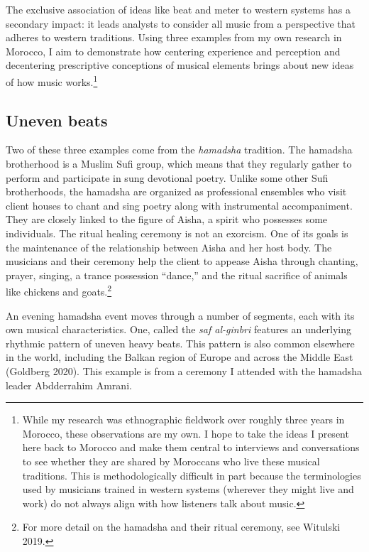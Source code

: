 \documentclass[twoside]{article}
\begin{document}
The exclusive association of ideas like beat and meter to western
systems has a secondary impact: it leads analysts to consider all music
from a perspective that adheres to western traditions. Using three
examples from my own research in Morocco, I aim to demonstrate how
centering experience and perception and decentering prescriptive
conceptions of musical elements brings about new ideas of how music
works.\footnote{While my research was ethnographic fieldwork over
  roughly three years in Morocco, these observations are my own. I hope
  to take the ideas I present here back to Morocco and make them central
  to interviews and conversations to see whether they are shared by
  Moroccans who live these musical traditions. This is methodologically
  difficult in part because the terminologies used by musicians trained
  in western systems (wherever they might live and work) do not always
  align with how listeners talk about music.}

\hypertarget{uneven-beats}{%
\subsection{Uneven beats}\label{uneven-beats}}

Two of these three examples come from the \emph{hamadsha} tradition. The
hamadsha brotherhood is a Muslim Sufi group, which means that they
regularly gather to perform and participate in sung devotional poetry.
Unlike some other Sufi brotherhoods, the hamadsha are organized as
professional ensembles who visit client houses to chant and sing poetry
along with instrumental accompaniment. They are closely linked to the
figure of Aisha, a spirit who possesses some individuals. The ritual
healing ceremony is not an exorcism. One of its goals is the maintenance
of the relationship between Aisha and her host body. The musicians and
their ceremony help the client to appease Aisha through chanting,
prayer, singing, a trance possession ``dance,'' and the ritual sacrifice
of animals like chickens and goats.\footnote{For more detail on the
  hamadsha and their ritual ceremony, see Witulski 2019.}

An evening hamadsha event moves through a number of segments, each with
its own musical characteristics. One, called the \emph{saf al-ginbri}
features an underlying rhythmic pattern of uneven heavy beats. This
pattern is also common elsewhere in the world, including the Balkan
region of Europe and across the Middle East (Goldberg 2020). This
example is from a ceremony I attended with the hamadsha leader
Abdderrahim Amrani.
\end{document}

